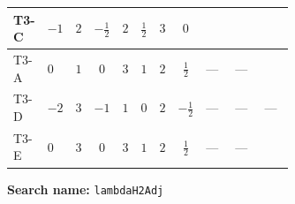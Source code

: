 \documentclass[8pt]{article}
\begin{document}
\begin{landscape}
\begin{longtable}{@{}llcccccc >{\raggedright\arraybackslash}p{0.21\linewidth} >{\raggedright\arraybackslash}p{0.21\linewidth} >{\raggedright\arraybackslash}p{0.21\linewidth}@{}}
\midrule
T3-C & $-1$ & $2$ & $-\frac{1}{2}$ & $2$ & $\frac{1}{2}$ & $3$ & $0$ & \scriptsize\adjustbox{max width=\linewidth}{$\begin{gathered} -9 {g_2}^2 {\lambda_{H2}^{\rm Adj}}\end{gathered}$} & \scriptsize\adjustbox{max width=\linewidth}{$\begin{gathered} +{\lambda_{12}^{\rm Adj}} {\lambda_{H1}^{\rm Adj}}\end{gathered}$} & \scriptsize\adjustbox{max width=\linewidth}{$\begin{gathered} +2 {\lambda_H} {\lambda_{H2}^{\rm Adj}}\end{gathered}$} \\
\midrule
T3-A & $0$ & $1$ & $0$ & $3$ & $1$ & $2$ & $\frac{1}{2}$ & --- & --- & \scriptsize\adjustbox{max width=\linewidth}{$\begin{gathered} +2 {\lambda_H} {\lambda_{H2}^{\rm Adj}}\end{gathered}$} \\
\midrule
T3-D & $-2$ & $3$ & $-1$ & $1$ & $0$ & $2$ & $-\frac{1}{2}$ & --- & --- & --- \\
\midrule
T3-E & $0$ & $3$ & $0$ & $3$ & $1$ & $2$ & $\frac{1}{2}$ & --- & --- & \scriptsize\adjustbox{max width=\linewidth}{$\begin{gathered} +2 {\lambda_H} {\lambda_{H2}^{\rm Adj}}\end{gathered}$} \\
\midrule
\bottomrule
\end{longtable}
\clearpage
\noindent\textbf{Search name: }\texttt{lambdaH2Adj}\par\smallskip

\end{landscape}
\end{document}
